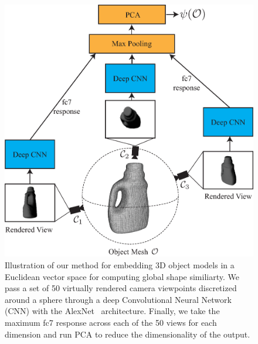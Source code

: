 \begin{figure}[t!]
\centering
\includegraphics[scale=0.25]{figures/illustrations/cnn_model.eps}
\caption{Illustration of our method for embedding 3D object models in a Euclidean vector space for computing global shape similiarty. We pass a set of 50 virtually rendered camera viewpoints discretized around a sphere through a deep Convolutional Neural Network (CNN) with the AlexNet~\cite{krizhevsky2012imagenet} architecture. Finally, we take the maximum fc7 response across each of the 50 views for each dimension and run PCA to reduce the dimensionality of the output.}
\vspace*{-15pt}
\end{figure}

